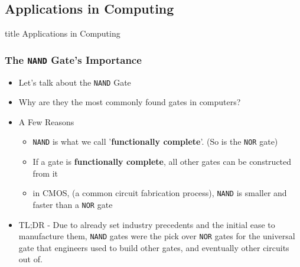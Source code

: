 \documentclass{beamer}
\begin{document}
            
        \subsection{Applications in Computing}
        
            \begin{frame}
                \vfill
                \centering
                \begin{beamercolorbox}[sep=8pt,center,shadow=true,rounded=true]{title}
                    Applications in Computing\par%
                \end{beamercolorbox}
                \vfill
            \end{frame}
            
            \begin{frame}
                \frametitle{The \texttt{NAND} Gate's Importance}
                \begin{itemize}
                    \item Let's talk about the \texttt{NAND} Gate
                    \item Why are they the most commonly found gates in computers?
                    \item A Few Reasons
                    \begin{itemize}
                        \item \texttt{NAND} is what we call '\textbf{functionally complete}'. (So is the \texttt{NOR} gate)
                        \item If a gate is \textbf{functionally complete}, all other gates can be constructed from it
                        \item in CMOS, (a common circuit fabrication process), \texttt{NAND} is smaller and faster than a \texttt{NOR} gate
                    \end{itemize}
                    \item TL;DR - Due to already set industry precedents and the initial ease to manufacture them, \texttt{NAND} gates were the pick over \texttt{NOR} gates for the universal gate that engineers used to build other gates, and eventually other circuits out of.
                \end{itemize}
               
            \end{frame}
            
\end{document}
